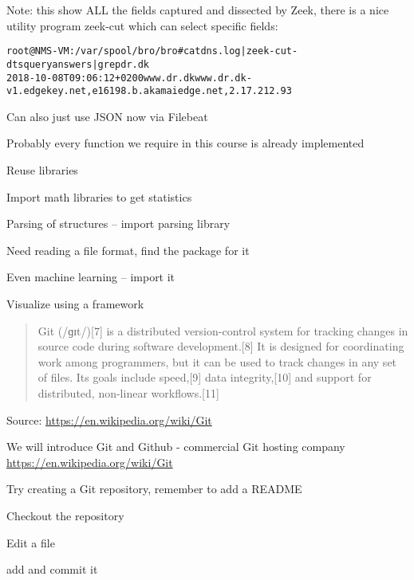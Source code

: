 \documentclass[Screen16to9,17pt]{foils}
\begin{document}
Note: this show ALL the fields captured and dissected by Zeek, there is a nice utility program zeek-cut which can select specific fields:

\begin{alltt}\small
root@NMS-VM:/var/spool/bro/bro# cat dns.log | zeek-cut -d ts query answers | grep dr.dk
2018-10-08T09:06:12+0200	www.dr.dk	www.dr.dk-v1.edgekey.net,e16198.b.akamaiedge.net,2.17.212.93
\end{alltt}

Can also just use JSON now via Filebeat







\begin{list2}
\item Probably every function we require in this course is already implemented
\item Reuse libraries
\item Import math libraries to get statistics
\item Parsing of structures -- import parsing library
\item Need reading a file format, find the package for it
\item Even machine learning -- import it
\item Visualize using a framework
\end{list2}




\begin{quote}
Git (/ɡɪt/)[7] is a distributed version-control system for tracking changes in source code during software development.[8] It is designed for coordinating work among programmers, but it can be used to track changes in any set of files. Its goals include speed,[9] data integrity,[10] and support for distributed, non-linear workflows.[11]
\end{quote}

Source: \url{https://en.wikipedia.org/wiki/Git}

\begin{list2}
\item We will introduce Git and Github - commercial Git hosting company\\
\url{https://en.wikipedia.org/wiki/Git}
\item Try creating a Git repository, remember to add a README
\item Checkout the repository
\item Edit a file
\item add and commit it
\end{list2}
\end{document}
